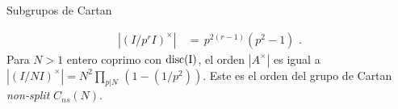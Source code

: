 \begin{subsection}{Subgrupos de Cartan}
\begin{ejemploSubgrupoDeCartan}
\begin{align*}
|(I/p^{r}I)^{\times}| & \,=\, p^{2(r-1)}(p^{2}-1)\text{ .}
\end{align*}
Para $N>1$ entero coprimo con $\rm{disc}(I)$, el orden $|A^{\times}|$ es igual a
$|(I/NI)^{\times}|=N^{2}\prod_{p|N}\,(1-(1/p^{2}))$. Este es el orden del grupo de
Cartan \textit{non-split} $C_{ns}(N)$.
%

\end{ejemploSubgrupoDeCartan}

\end{subsection}

